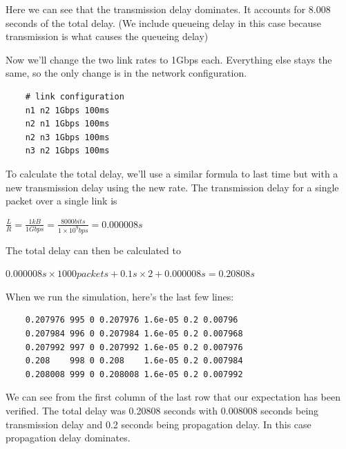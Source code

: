 \documentclass[11pt]{article}
\begin{document}
Here we can see that the transmission delay dominates. It accounts for 8.008 seconds of the total delay. (We include queueing delay in this case because transmission is what causes the queueing delay)

Now we'll change the two link rates to 1Gbps each. Everything else stays the same, so the only change is in the network configuration.

\vspace{5mm}

\begin{lstlisting}
    # link configuration
    n1 n2 1Gbps 100ms
    n2 n1 1Gbps 100ms
    n2 n3 1Gbps 100ms
    n3 n2 1Gbps 100ms
\end{lstlisting}

\vspace{5mm}

To calculate the total delay, we'll use a similar formula to last time but with a new transmission delay using the new rate. The transmission delay for a single packet over a single link is

\vspace{5mm}

\(\frac{L}{R} = \frac{1kB}{1Gbps} = \frac{8000bits}{1\times10^9 bps} = 0.000008s\)

\vspace{5mm}

The total delay can then be calculated to 

\vspace{5mm}

\(0.000008s\times1000packets + 0.1s\times2 + 0.000008s = 0.20808s\)

\vspace{5mm}

When we run the simulation, here's the last few lines:

\vspace{5mm}

\begin{lstlisting}
    0.207976 995 0 0.207976 1.6e-05 0.2 0.00796
    0.207984 996 0 0.207984 1.6e-05 0.2 0.007968
    0.207992 997 0 0.207992 1.6e-05 0.2 0.007976
    0.208    998 0 0.208    1.6e-05 0.2 0.007984
    0.208008 999 0 0.208008 1.6e-05 0.2 0.007992
\end{lstlisting}

\vspace{5mm}

We can see from the first column of the last row that our expectation has been verified. The total delay was 0.20808 seconds with 0.008008 seconds being transmission delay and 0.2 seconds being propagation delay. In this case propagation delay dominates.
\end{document}
